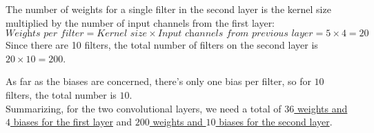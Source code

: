 The number of weights for a single filter in the second layer is the kernel size multiplied by the number of input channels from the first layer:
\[
\textit{Weights per filter} = \textit{Kernel size} \times \textit{Input channels from previous layer} = 5 \times 4=20
\]
Since there are 10 filters, the total number of filters on the second layer is $20 \times 10 = 200$.

As far as the biases are concerned, there's only one bias per filter, so for $10$ filters, the total number is $10$.\\

Summarizing, for the two convolutional layers, we need a total of \underline{$36$ weights and $4$ biases for the first layer} and \underline{$200$ weights and $10$ biases for the second layer}.